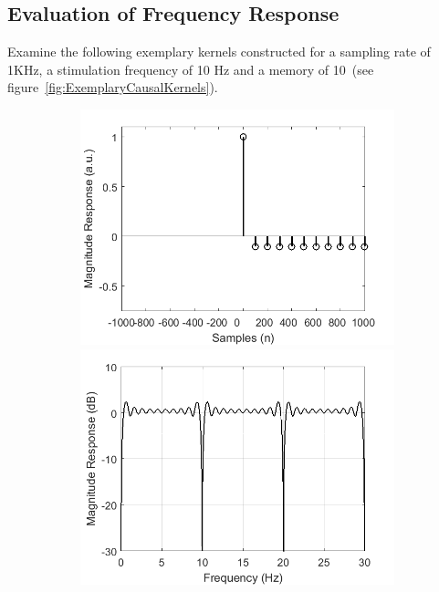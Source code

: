 \documentclass[a4paper]{article}
\newcommand{\figref}[1]{(see figure~\ref{#1})}
\begin{document}
\subsection{Evaluation of Frequency Response}\label{sec:EvaluationFreq}

Examine the following exemplary kernels constructed for a sampling rate of 1KHz, a stimulation frequency of 10 Hz and a memory of 10~\figref{fig:ExemplaryCausalKernels}.

\begin{figure}[hbtp]
    \begin{subfigure}{.245\textwidth}
        \includegraphics[width=\textwidth]{img/causal/kernel_ave.png}\\
        \includegraphics[width=\textwidth]{img/causal/mag_ave.png}

\end{subfigure}
\end{figure}
\end{document}
